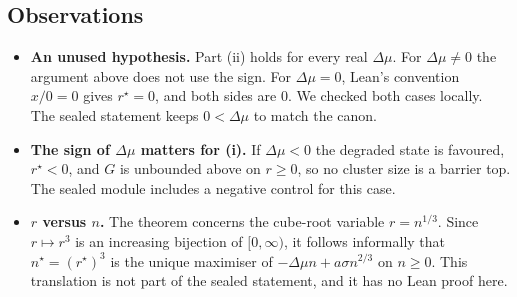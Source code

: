 \documentclass[11pt]{article}
\theoremstyle{definition}
\theoremstyle{remark}
\begin{document}
\subsection{Observations}
\begin{itemize}
\item \textbf{An unused hypothesis.} Part (ii) holds for every real $\Delta\mu$. For $\Delta\mu\ne0$ the argument above
does not use the sign. For $\Delta\mu=0$, Lean's convention $x/0=0$ gives $r^\star=0$, and both sides are $0$.
We checked both cases locally. The sealed statement keeps $0<\Delta\mu$ to match the canon.
\item \textbf{The sign of $\Delta\mu$ matters for (i).} If $\Delta\mu<0$ the degraded state is favoured, $r^\star<0$, and
$G$ is unbounded above on $r\ge0$, so no cluster size is a barrier top. The sealed module includes a negative control for this case.
\item \textbf{$r$ versus $n$.} The theorem concerns the cube-root variable $r=n^{1/3}$. Since $r\mapsto r^3$ is an increasing
bijection of $[0,\infty)$, it follows informally that $n^\star=(r^\star)^3$ is the unique maximiser of
$-\Delta\mu n+a\sigma n^{2/3}$ on $n\ge0$. This translation is not part of the sealed statement, and it has no Lean proof here.
\end{itemize}
\end{document}
